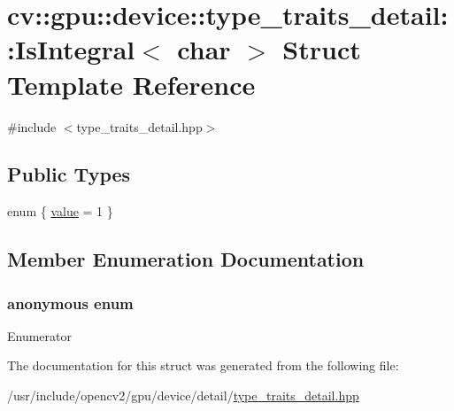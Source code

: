\hypertarget{structcv_1_1gpu_1_1device_1_1type__traits__detail_1_1IsIntegral_3_01char_01_4}{\section{cv\-:\-:gpu\-:\-:device\-:\-:type\-\_\-traits\-\_\-detail\-:\-:Is\-Integral$<$ char $>$ Struct Template Reference}
\label{structcv_1_1gpu_1_1device_1_1type__traits__detail_1_1IsIntegral_3_01char_01_4}
}


{\ttfamily \#include $<$type\-\_\-traits\-\_\-detail.\-hpp$>$}

\subsection*{Public Types}
\begin{DoxyCompactItemize}
\item 
enum \{ \hyperlink{structcv_1_1gpu_1_1device_1_1type__traits__detail_1_1IsIntegral_3_01char_01_4_a12bcc73bb537e8ab6ee3cb04ab77809da05717efe54de41c43dafa0adde897547}{value} = 1
 \}
\end{DoxyCompactItemize}


\subsection{Member Enumeration Documentation}
\hypertarget{structcv_1_1gpu_1_1device_1_1type__traits__detail_1_1IsIntegral_3_01char_01_4_a12bcc73bb537e8ab6ee3cb04ab77809d}{\subsubsection[{anonymous enum}]{\setlength{\rightskip}{0pt plus 5cm}anonymous enum}}\label{structcv_1_1gpu_1_1device_1_1type__traits__detail_1_1IsIntegral_3_01char_01_4_a12bcc73bb537e8ab6ee3cb04ab77809d}
\begin{Desc}
\item[Enumerator]\par
\begin{description}
\item[{\em 
\hypertarget{structcv_1_1gpu_1_1device_1_1type__traits__detail_1_1IsIntegral_3_01char_01_4_a12bcc73bb537e8ab6ee3cb04ab77809da05717efe54de41c43dafa0adde897547}{value}\label{structcv_1_1gpu_1_1device_1_1type__traits__detail_1_1IsIntegral_3_01char_01_4_a12bcc73bb537e8ab6ee3cb04ab77809da05717efe54de41c43dafa0adde897547}
}]\end{description}
\end{Desc}


The documentation for this struct was generated from the following file\-:\begin{DoxyCompactItemize}
\item 
/usr/include/opencv2/gpu/device/detail/\hyperlink{type__traits__detail_8hpp}{type\-\_\-traits\-\_\-detail.\-hpp}\end{DoxyCompactItemize}
